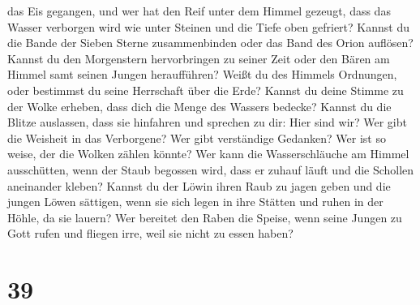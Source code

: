 das Eis gegangen, und wer hat den Reif unter dem Himmel gezeugt,
 dass das Wasser verborgen wird wie unter Steinen und die
Tiefe oben gefriert?  Kannst du die Bande der Sieben
Sterne zusammenbinden oder das Band des Orion auflösen? 
Kannst du den Morgenstern hervorbringen zu seiner Zeit oder den Bären am
Himmel samt seinen Jungen heraufführen?  Weißt du des
Himmels Ordnungen, oder bestimmst du seine Herrschaft über die Erde?
 Kannst du deine Stimme zu der Wolke erheben, dass dich
die Menge des Wassers bedecke?  Kannst du die Blitze
auslassen, dass sie hinfahren und sprechen zu dir: Hier sind wir?
 Wer gibt die Weisheit in das Verborgene? Wer gibt
verständige Gedanken?  Wer ist so weise, der die Wolken
zählen könnte? Wer kann die Wasserschläuche am Himmel ausschütten,
 wenn der Staub begossen wird, dass er zuhauf läuft und
die Schollen aneinander kleben?  Kannst du der Löwin
ihren Raub zu jagen geben und die jungen Löwen sättigen, 
wenn sie sich legen in ihre Stätten und ruhen in der Höhle, da sie
lauern?  Wer bereitet den Raben die Speise, wenn seine
Jungen zu Gott rufen und fliegen irre, weil sie nicht zu essen haben?

\hypertarget{section-38}{%
\section{39}\label{section-38}}

